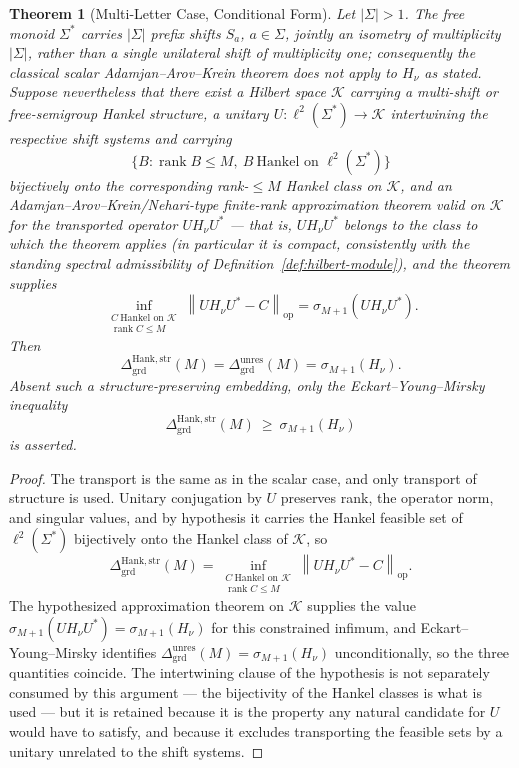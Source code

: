 \documentclass[12pt]{article}
\newtheorem{theorem}{Theorem}[section]
\theoremstyle{definition}
\newcommand{\norm}[1]{\left\lVert#1\right\rVert}
\newcommand{\Dunres}{\Delta_{\mathrm{grd}}^{\mathrm{unres}}}
\newcommand{\DHankstr}{\Delta_{\mathrm{grd}}^{\mathrm{Hank,str}}}
\begin{document}
\begin{theorem}[Multi-Letter Case, Conditional Form]
\label{thm:aak-multiletter}
Let $|\Sigma|>1$.  The free monoid $\Sigma^*$ carries $|\Sigma|$ prefix
shifts $S_a$, $a\in\Sigma$, jointly an isometry of multiplicity $|\Sigma|$,
rather than a single unilateral shift of multiplicity one; consequently the
classical scalar Adamjan--Arov--Krein theorem does not apply to $H_\nu$ as
stated.  Suppose nevertheless that there exist a Hilbert space $\mathcal K$
carrying a multi-shift or free-semigroup Hankel structure, a unitary
$U:\ell^2(\Sigma^*)\to\mathcal K$ intertwining the respective shift systems and
carrying
\[
\{B:\operatorname{rank}B\le M,\ B\ \text{Hankel on }\ell^2(\Sigma^*)\}
\]
bijectively onto the corresponding rank-$\le M$ Hankel class on $\mathcal K$,
and an Adamjan--Arov--Krein/Nehari-type finite-rank approximation theorem
valid on $\mathcal K$ \emph{for the transported operator} $UH_\nu U^{*}$ ---
that is, $UH_\nu U^{*}$ belongs to the class to which the theorem applies (in
particular it is compact, consistently with the standing spectral
admissibility of Definition~\ref{def:hilbert-module}), and the theorem
supplies
\[
\inf_{\substack{C\ \text{Hankel on }\mathcal K\\ \operatorname{rank}C\le M}}
\norm{UH_\nu U^{*}-C}_{\mathrm{op}}
=
\sigma_{M+1}(UH_\nu U^{*}).
\]
Then
\[
\DHankstr(M)=\Dunres(M)=\sigma_{M+1}(H_\nu).
\]
Absent such a structure-preserving embedding, only the Eckart--Young--Mirsky
inequality
\[
\DHankstr(M)\ \ge\ \sigma_{M+1}(H_\nu)
\]
is asserted.
\end{theorem}

\begin{proof}
The transport is the same as in the scalar case, and only transport of
structure is used.  Unitary conjugation by $U$ preserves rank, the operator
norm, and singular values, and by hypothesis it carries the Hankel feasible
set of $\ell^2(\Sigma^*)$ bijectively onto the Hankel class of $\mathcal K$, so
\[
\DHankstr(M)
=
\inf_{\substack{C\ \text{Hankel on }\mathcal K\\ \operatorname{rank}C\le M}}
\norm{UH_\nu U^{*}-C}_{\mathrm{op}}.
\]
The hypothesized approximation theorem on $\mathcal K$ supplies the value
$\sigma_{M+1}(UH_\nu U^{*})=\sigma_{M+1}(H_\nu)$ for this constrained infimum,
and Eckart--Young--Mirsky identifies $\Dunres(M)=\sigma_{M+1}(H_\nu)$
unconditionally, so the three quantities coincide.  The intertwining clause of
the hypothesis is not separately consumed by this argument --- the bijectivity
of the Hankel classes is what is used --- but it is retained because it is the
property any natural candidate for $U$ would have to satisfy, and because it
excludes transporting the feasible sets by a unitary unrelated to the shift
systems.
\end{proof}
\end{document}
